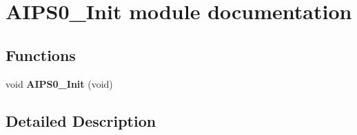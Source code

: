 \hypertarget{group___a_i_p_s0___init__module}{}\section{A\+I\+P\+S0\+\_\+\+Init module documentation}
\label{group___a_i_p_s0___init__module}
\subsection*{Functions}
\begin{DoxyCompactItemize}
\item 
void {\bfseries A\+I\+P\+S0\+\_\+\+Init} (void)\hypertarget{group___a_i_p_s0___init__module_gaf2dae99e73ddd3627bdc060e62c8821d}{}\label{group___a_i_p_s0___init__module_gaf2dae99e73ddd3627bdc060e62c8821d}

\end{DoxyCompactItemize}


\subsection{Detailed Description}
